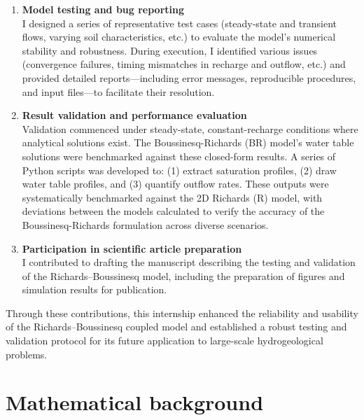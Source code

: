 \documentclass[12pt,a4paper]{article}
\begin{document}
\begin{enumerate}  
    \item \textbf{Model testing and bug reporting}  
    \vspace{0.25cm}\\
    I designed a series of representative test cases (steady-state and transient flows, varying soil characteristics, etc.) to evaluate the model’s numerical stability and robustness. During execution, I identified various issues (convergence failures, timing mismatches in recharge and outflow, etc.) and provided detailed reports—including error messages, reproducible procedures, and input files—to facilitate their resolution.  
    
    \item \textbf{Result validation and performance evaluation}\vspace{0.25cm}\\
    Validation commenced under steady-state, constant-recharge conditions where analytical solutions exist. The Boussinesq-Richards (BR) model's water table solutions were benchmarked against these closed-form results. A series of Python scripts was developed to: (1) extract saturation profiles, (2) draw water table profiles, and (3) quantify outflow rates. These outputs were systematically benchmarked against the 2D Richards (R) model, with deviations between the models calculated to verify the accuracy of the Boussinesq-Richards formulation across diverse scenarios.
    

    \item \textbf{Participation in scientific article preparation}\vspace{0.25cm}\\
    I contributed to drafting the manuscript describing the testing and validation of the Richards–Boussinesq model, including the preparation of figures and simulation results for publication. 
\end{enumerate}  

Through these contributions, this internship enhanced the reliability and usability of the Richards–Boussinesq coupled model and established a robust testing and validation protocol for its future application to large-scale hydrogeological problems.  


\section{Mathematical background}  
\end{document}
